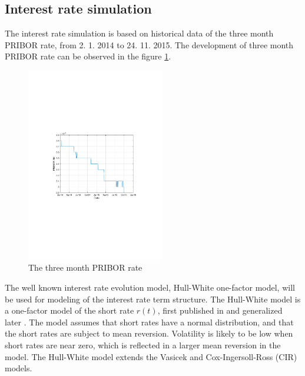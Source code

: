 \documentclass{amsart}
\theoremstyle{definition}\newtheorem{definition}[theorem]{Definition}
\theoremstyle{remark}\newtheorem{remark}[theorem]{Remark}
\begin{document}
\subsection{Interest rate simulation}
The interest rate simulation is based on historical data of the three month PRIBOR rate, from 2. 1. 2014 to 24. 11. 2015.  
The development of three month PRIBOR rate can be observed in the figure \ref{PRIBOR}.

\begin{figure}[!htbp]
  \centering 
	\includegraphics[width=6cm, clip, trim= 110 270 110 270]{IMG/PRIBOR.pdf}
  \caption{The three month PRIBOR rate}  \label{PRIBOR}
\end{figure}

The well known interest rate evolution model, Hull-White one-factor model, will be used for modeling of the interest rate term structure. 
The Hull-White model is a one-factor model of the short rate $r(t)$, first published in \cite{hull1990pricing} and generalized later \cite{hull2001general}.
The model assumes that short rates have a normal distribution, and that the short rates are subject to mean reversion. 
Volatility is likely to be low when short rates are near zero, which is reflected in a larger mean reversion in the model. 
The Hull-White model extends the Vasicek and Cox-Ingersoll-Ross (CIR) models.
\end{document}
